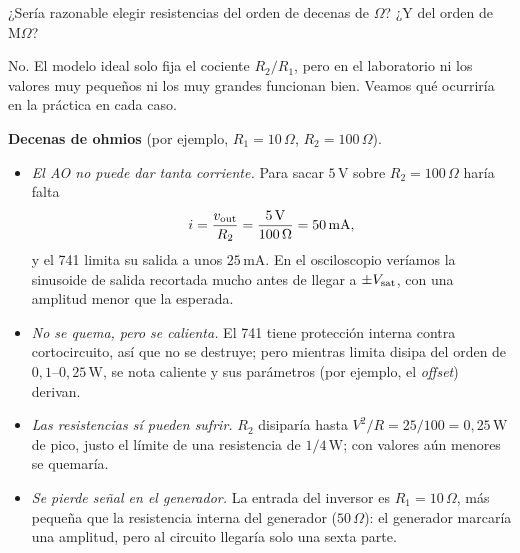 \begin{pregunta}
¿Sería razonable elegir resistencias del orden de decenas de $\Omega$? ¿Y del orden de $\mathrm{M}\Omega$?
\end{pregunta}

\begin{respuesta}
No. El modelo ideal solo fija el cociente $R_2/R_1$, pero en el laboratorio ni los valores muy pequeños ni
los muy grandes funcionan bien. Veamos qué ocurriría en la práctica en cada caso.

\textbf{Decenas de ohmios} (por ejemplo, $R_1=10\,\Omega$, $R_2=100\,\Omega$).
\begin{itemize}
  \item \emph{El AO no puede dar tanta corriente.} Para sacar $5\,\mathrm{V}$ sobre $R_2=100\,\Omega$ haría falta
        \begin{equation}\label{eq:r-Iout}
          i=\frac{v_{\mathrm{out}}}{R_2}=\frac{5\,\mathrm{V}}{100\,\Omega}=50\,\mathrm{mA},
        \end{equation}
        y el 741 limita su salida a unos $25\,\mathrm{mA}$. En el osciloscopio veríamos la sinusoide de salida
        recortada mucho antes de llegar a $\pm V_{\mathrm{sat}}$, con una amplitud menor que la esperada.
  \item \emph{No se quema, pero se calienta.} El 741 tiene protección interna contra cortocircuito, así que no
        se destruye; pero mientras limita disipa del orden de $0{,}1$--$0{,}25\,\mathrm{W}$, se nota caliente y sus
        parámetros (por ejemplo, el \emph{offset}) derivan.
  \item \emph{Las resistencias sí pueden sufrir.} $R_2$ disiparía hasta $V^{2}/R=25/100=0{,}25\,\mathrm{W}$ de pico, justo
        el límite de una resistencia de $1/4\,\mathrm{W}$; con valores aún menores se quemaría.
  \item \emph{Se pierde señal en el generador.} La entrada del inversor es $R_1=10\,\Omega$, más pequeña que la
        resistencia interna del generador ($50\,\Omega$): el generador marcaría una amplitud, pero al circuito
        llegaría solo una sexta parte.
\end{itemize}


\end{respuesta}
